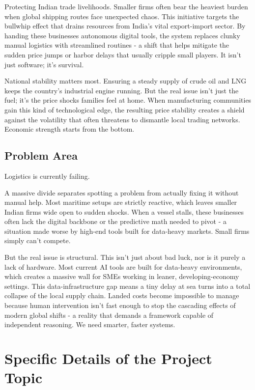Protecting Indian trade livelihoods. Smaller firms often bear the heaviest burden when global shipping routes face unexpected chaos. This initiative targets the bullwhip effect that drains resources from India's vital export-import sector. By handing these businesses autonomous digital tools, the system replaces clunky manual logistics with streamlined routines - a shift that helps mitigate the sudden price jumps or harbor delays that usually cripple small players. It isn't just software; it's survival.

National stability matters most. Ensuring a steady supply of crude oil and LNG keeps the country's industrial engine running. But the real issue isn't just the fuel; it's the price shocks families feel at home. When manufacturing communities gain this kind of technological edge, the resulting price stability creates a shield against the volatility that often threatens to dismantle local trading networks. Economic strength starts from the bottom.

\subsection[Problem Area]{\textbf{Problem Area}}

Logistics is currently failing.

A massive divide separates spotting a problem from actually fixing it without manual help. Most maritime setups are strictly reactive, which leaves smaller Indian firms wide open to sudden shocks. When a vessel stalls, these businesses often lack the digital backbone or the predictive math needed to pivot - a situation made worse by high-end tools built for data-heavy markets. Small firms simply can't compete.

But the real issue is structural. This isn't just about bad luck, nor is it purely a lack of hardware. Most current AI tools are built for data-heavy environments, which creates a massive wall for SMEs working in leaner, developing-economy settings. This data-infrastructure gap means a tiny delay at sea turns into a total collapse of the local supply chain. Landed costs become impossible to manage because human intervention isn't fast enough to stop the cascading effects of modern global shifts - a reality that demands a framework capable of independent reasoning. We need smarter, faster systems.

\section[Specific Details of the Project Topic]{\textbf{Specific Details of the Project Topic}}

